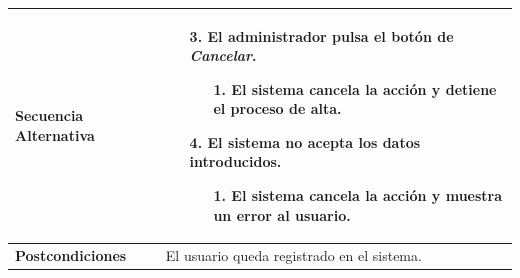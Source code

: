 \begin{longtable}{| p{4cm} | p{10cm} |}
\\
\hline
\textbf{Secuencia Alternativa} &\mbox{}\par\vspace{-\baselineskip}
\begin{enumerate}[leftmargin=0.9cm, topsep=0.1cm]
\item[3.] El administrador pulsa el botón de \textit{Cancelar}.
	\begin{itemize}
	\item[1.] El sistema cancela la acción y detiene el proceso de alta.
	\end{itemize}
\item[4.] El sistema no acepta los datos introducidos.
	\begin{itemize}
	\item[1.] El sistema cancela la acción y muestra un error al usuario.
	\end{itemize}
\end{enumerate}
\\

\hline
\textbf{Postcondiciones} & 
El usuario queda registrado en el sistema.\\
\hline
\end{longtable}



\newpage
